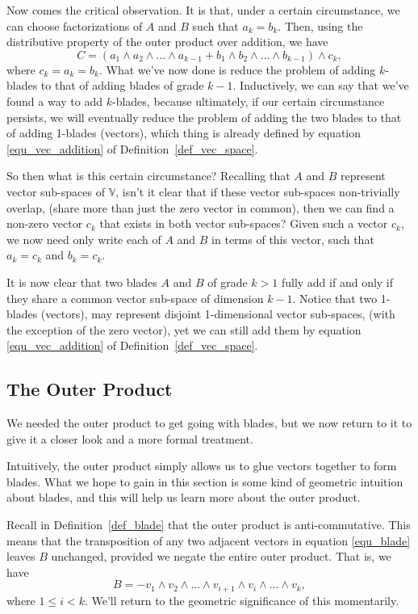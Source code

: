 \documentclass[12pt]{article}
\newcommand{\V}{\mathbb{V}}
\begin{document}
Now comes the critical observation.  It is that, under a certain circumstance, we
can choose factorizations of $A$ and $B$ such that $a_k=b_k$.  Then, using
the distributive property of the outer product over addition, we have
\begin{equation}
C = (a_1\wedge a_2\wedge\dots\wedge a_{k-1}+b_1\wedge b_2\wedge\dots\wedge b_{k-1})\wedge c_k,
\end{equation}
where $c_k=a_k=b_k$.  What we've now done is reduce the problem of adding
$k$-blades to that of adding blades of grade $k-1$.  Inductively, we can say that we've
found a way to add $k$-blades, because ultimately, if our certain circumstance persists,
we will eventually reduce the problem of adding the two blades to that
of adding 1-blades (vectors), which thing is already defined by equation
\eqref{equ_vec_addition} of Definition~\ref{def_vec_space}.

So then what is this certain circumstance?  Recalling that $A$ and $B$ represent
vector sub-spaces of $\V$, isn't it clear that if these vector sub-spaces
non-trivially overlap, (share more than just the zero vector in common), then we can find
a non-zero vector $c_k$ that exists in both vector sub-spaces?  Given such a
vector $c_k$, we now need only write each of $A$ and $B$ in terms of this
vector, such that $a_k=c_k$ and $b_k=c_k$.

It is now clear that two blades $A$ and $B$ of grade $k>1$ fully add if and only if they
share a common vector sub-space of dimension $k-1$.  Notice that
two 1-blades (vectors), may represent disjoint 1-dimensional vector sub-spaces,
(with the exception of the zero vector), yet we can still add them by
equation \eqref{equ_vec_addition} of Definition~\ref{def_vec_space}.

\subsection{The Outer Product}

We needed the outer product to get going with blades, but we now
return to it to give it a closer look and a more formal treatment.

Intuitively, the outer product simply allows us to glue vectors
together to form blades.  What we hope to gain in this section
is some kind of geometric intuition about blades, and this will
help us learn more about the outer product.

Recall in Definition~\ref{def_blade} that the outer product is anti-commutative.
This means that the transposition of any two adjacent vectors in
equation \eqref{equ_blade} leaves $B$ unchanged, provided we negate the
entire outer product.  That is, we have
\begin{equation}\label{equ_adj_trans}
B = -v_1\wedge v_2\wedge\dots\wedge v_{i+1}\wedge v_i\wedge\dots\wedge v_k,
\end{equation}
where $1\leq i<k$.  We'll return to the geometric significance of this momentarily.
\end{document}
